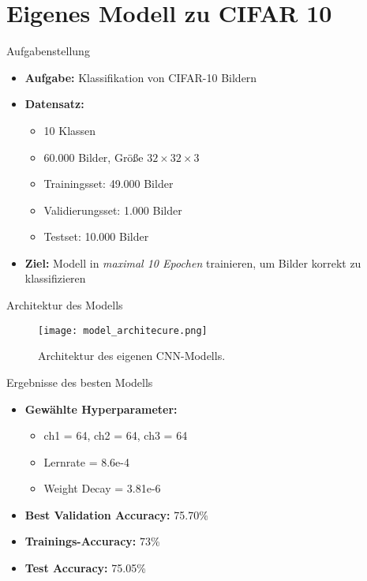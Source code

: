 \section{Eigenes Modell zu CIFAR 10}


\begin{frame}{Aufgabenstellung}
    \begin{itemize}
        \item \textbf{Aufgabe:} Klassifikation von CIFAR-10 Bildern
        \item \textbf{Datensatz:}
            \begin{itemize}
                \item 10 Klassen
                \item 60.000 Bilder, Größe $32\times32\times3$
                \item Trainingsset: 49.000 Bilder
                \item Validierungsset: 1.000 Bilder
                \item Testset: 10.000 Bilder
            \end{itemize}
        \item \textbf{Ziel:} Modell in \emph{maximal 10 Epochen} trainieren, um Bilder korrekt zu klassifizieren
    \end{itemize}
\end{frame}


\begin{frame}{Architektur des Modells}
    \begin{figure}
        \centering
        \texttt{[image: model\_architecure.png]}
        \caption{Architektur des eigenen CNN-Modells.}
    \end{figure}
\end{frame}


\begin{frame}{Ergebnisse des besten Modells}
\begin{itemize}
    \item \textbf{Gewählte Hyperparameter:}
        \begin{itemize}
            \item ch1 = 64, ch2 = 64, ch3 = 64
            \item Lernrate = 8.6e-4
            \item Weight Decay = 3.81e-6
        \end{itemize}
    \item \textbf{Best Validation Accuracy:} \alert{75.70\%}
    \item \textbf{Trainings-Accuracy:} \alert{73\%}
    \item \textbf{Test Accuracy:} \alert{75.05\%}
\end{itemize}
\end{frame}

